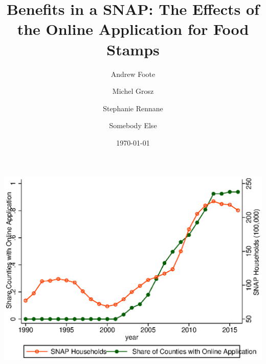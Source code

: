 \documentclass[11pt,letterpaper]{article}
\title{Benefits in a SNAP: The Effects of the Online Application for Food Stamps}
\author[1]{Andrew Foote}
\author[2]{Michel Grosz}
\author[3]{Stephanie Rennane}
\author[4]{Somebody Else}
\affil[1]{Census Bureau}
\affil[2]{Abt Associates}
\affil[3]{RAND Corporation}
\date{\today\\  }
\begin{document}
\maketitle

\includegraphics{tabfig/rolloutgraph_share}

\end{document}
